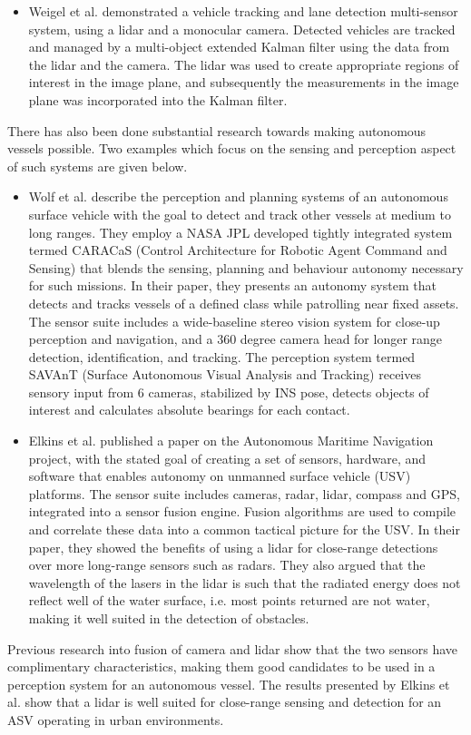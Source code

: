 \begin{itemize}
	\item Weigel et al. \cite{weigel_vehicle_tracking} demonstrated a vehicle tracking and lane detection multi-sensor system, using a lidar and a monocular camera. Detected vehicles are tracked and managed by a multi-object extended Kalman filter using the data from the lidar and the camera. The lidar was used to create appropriate regions of interest in the image plane, and subsequently the measurements in the image plane was incorporated into the Kalman filter.
\end{itemize}

There has also been done substantial research towards making autonomous vessels possible. Two examples which focus on the sensing and perception aspect of such systems are given below.
\begin{itemize}
	\item Wolf et al. \cite{ROB:ROB20371} describe the perception and planning systems of an autonomous surface vehicle with the goal to detect and track other vessels at medium to long ranges. They employ a NASA JPL developed tightly integrated system termed CARACaS (Control Architecture for Robotic Agent Command and Sensing) that blends the sensing, planning and behaviour autonomy necessary for such missions. In their paper, they presents an autonomy system that detects and tracks vessels of a defined class while patrolling near fixed assets. The sensor suite includes a wide-baseline stereo vision system for close-up perception and navigation, and a 360 degree camera head for longer range detection, identification, and tracking. The perception system termed SAVAnT (Surface Autonomous Visual Analysis and Tracking) receives sensory input from 6 cameras, stabilized by INS pose, detects objects of interest and calculates absolute bearings for each contact.
	\item Elkins et al. \cite{ROB:ROB20367} published a paper on the Autonomous Maritime Navigation project, with the stated goal of creating a set of sensors, hardware, and software that enables autonomy on unmanned surface vehicle (USV) platforms. The sensor suite includes cameras, radar, lidar, compass and GPS, integrated into a sensor fusion engine. Fusion algorithms are used to compile and correlate these data into a common tactical picture for the USV. In their paper, they showed the benefits of using a lidar for close-range detections over more long-range sensors such as radars. They also argued that the wavelength of the lasers in the lidar is such that the radiated energy does not reflect well of the water surface, i.e. most points returned are not water, making it well suited in the detection of obstacles.
\end{itemize} 
Previous research into fusion of camera and lidar show that the two sensors have complimentary characteristics, making them good candidates to be used in a perception system for an autonomous vessel. The results presented by Elkins et al. show that a lidar is well suited for close-range sensing and detection for an ASV operating in urban environments.
